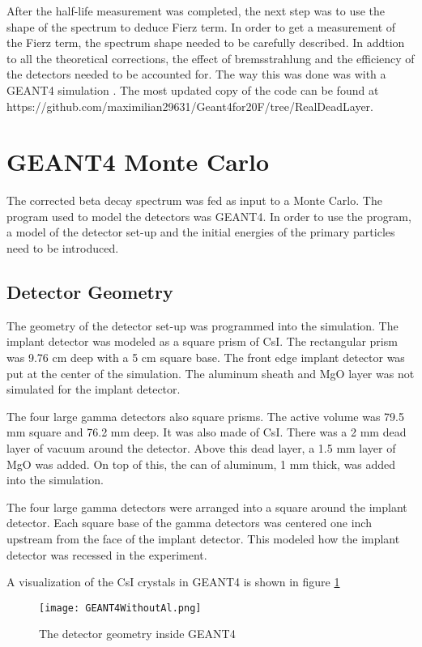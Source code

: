 

After the half-life measurement was completed, the next step was to use the shape of the spectrum to deduce Fierz term. 
In order to get a measurement of the Fierz term, the spectrum shape needed to be carefully described.
In addtion to all the theoretical corrections, the effect of bremsstrahlung and the efficiency of the detectors needed to be accounted for.
The way this was done was with a GEANT4 simulation \cite{Ago03}.
The most updated copy of the code can be found at https://github.com/maximilian29631/Geant4for20F/tree/RealDeadLayer. 

\section{GEANT4 Monte Carlo}
The corrected beta decay spectrum was fed as input to a Monte Carlo.
The program used to model the detectors was GEANT4.
In order to use the program, a model of the detector set-up and the initial energies of the primary particles need to be introduced.  

\subsection{Detector Geometry}
The geometry of the detector set-up was programmed into the simulation.
The implant detector was modeled as a square prism of CsI.
The rectangular prism was 9.76 cm deep with a 5 cm square base.
The front edge implant detector was put at the center of the simulation.
The aluminum sheath and MgO layer was not simulated for the implant detector.

The four large gamma detectors also square prisms.
The active volume was 79.5 mm square and 76.2 mm deep.
It was also made of CsI.
There was a 2 mm dead layer of vacuum around the detector.
Above this dead layer, a 1.5 mm layer of MgO was added.
On top of this, the can of aluminum, 1 mm thick, was added into the simulation.

The four large gamma detectors were arranged into a square around the implant detector.
Each square base of the gamma detectors was centered one inch upstream from the face of the implant detector.
This modeled how the implant detector was recessed in the experiment.

A visualization of the CsI crystals in GEANT4 is shown in figure \ref{fig:GEANT4Det}

\begin{figure}[!htb]
	\centerline{\texttt{[image: GEANT4WithoutAl.png]}}
	\caption{The detector geometry inside GEANT4}
	\label{fig:GEANT4Det}
\end{figure}

